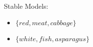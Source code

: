 \begin{Loesung}
{\begin{UList}
Stable Models:
\begin{itemize}
\item $\{\mathit{red},\mathit{meat},\mathit{cabbage}\}$
\item $\{\mathit{white},\mathit{fish},\mathit{asparagus}\}$
\end{itemize}
\end{UList}}
\end{Loesung}

